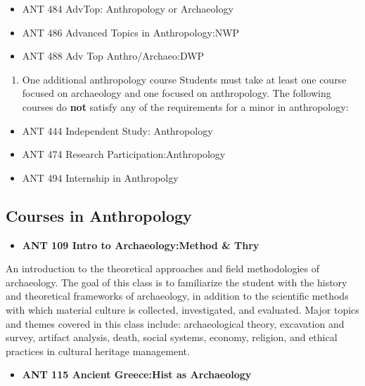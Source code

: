 \documentclass[
  letterpaper,
]{scrbook}
\providecommand{\tightlist}{%
  \setlength{\itemsep}{0pt}\setlength{\parskip}{0pt}}
\begin{document}
\begin{itemize}
\tightlist
\item
  ANT 484 AdvTop: Anthropology or Archaeology
\item
  ANT 486 Advanced Topics in Anthropology:NWP
\item
  ANT 488 Adv Top Anthro/Archaeo:DWP
\end{itemize}

\begin{enumerate}
\def\labelenumi{\arabic{enumi}.}
\setcounter{enumi}{5}
\tightlist
\item
  One additional anthropology course Students must take at least one
  course focused on archaeology and one focused on anthropology. The
  following courses do \textbf{not} satisfy any of the requirements for
  a minor in anthropology:
\end{enumerate}

\begin{itemize}
\tightlist
\item
  ANT 444 Independent Study: Anthropology
\item
  ANT 474 Research Participation:Anthropology
\item
  ANT 494 Internship in Anthropolgy
\end{itemize}

\subsection{Courses in Anthropology}\label{courses-in-anthropology}

\begin{itemize}
\tightlist
\item
  \textbf{ANT 109 Intro to Archaeology:Method \& Thry}
\end{itemize}

An introduction to the theoretical approaches and field methodologies of
archaeology. The goal of this class is to familiarize the student with
the history and theoretical frameworks of archaeology, in addition to
the scientific methods with which material culture is collected,
investigated, and evaluated. Major topics and themes covered in this
class include: archaeological theory, excavation and survey, artifact
analysis, death, social systems, economy, religion, and ethical
practices in cultural heritage management.

\begin{itemize}
\tightlist
\item
  \textbf{ANT 115 Ancient Greece:Hist as Archaeology}
\end{itemize}
\end{document}
